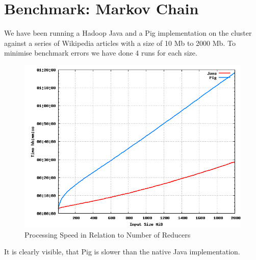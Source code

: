 \section{Benchmark: Markov Chain}

We have been running a Hadoop Java and a Pig implementation on the cluster against a series of Wikipedia articles with a size of 10 Mb to 2000 Mb. To minimise benchmark errors we have done 4 runs for each size.

\begin{figure}[H]
  \begin{center}
    \includegraphics[width=\textwidth]{../benchmarks/markov}
  \end{center}
  \caption{Processing Speed in Relation to Number of Reducers}
  \label{fig:reducers}
\end{figure}

It is clearly visible, that Pig is slower than the native Java implementation.